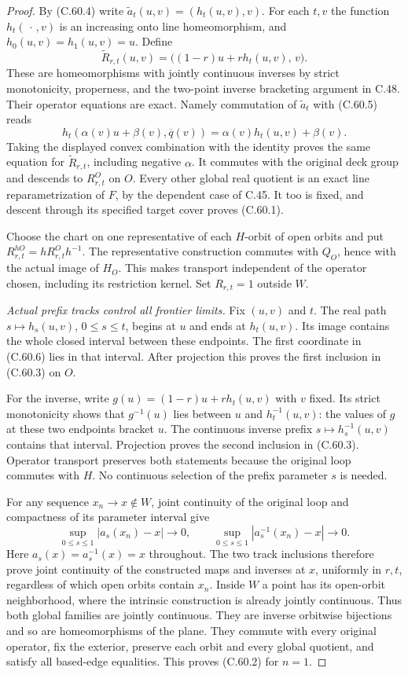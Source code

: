 \begin{proof}
By (C.60.4) write
$\widetilde a_t(u,v)=(h_t(u,v),v)$.
For each $t,v$ the function $h_t(\,\cdot\,,v)$ is
an increasing onto line homeomorphism, and
$h_0(u,v)=h_1(u,v)=u$.
Define
\[
 \widetilde R_{r,t}(u,v)
                   =\bigl((1-r)u+r h_t(u,v),\,v\bigr). \tag{C.60.6}
\]
These are homeomorphisms with jointly continuous
inverses by strict monotonicity, properness, and
the two-point inverse bracketing argument in C.48.
Their operator equations are exact. Namely
commutation of $\widetilde a_t$ with (C.60.5) reads
\[
 h_t(\alpha(v)u+\beta(v),\overline q(v))
                         =\alpha(v)h_t(u,v)+\beta(v).
 \]
Taking the displayed convex combination with the
identity proves the same equation for
$\widetilde R_{r,t}$, including negative $\alpha$.
It commutes with the original deck group and
descends to $R^O_{r,t}$ on $O$.
Every other global real quotient is an exact
line reparametrization of $F$, by the dependent
case of C.45. It too is fixed, and descent through
its specified target cover proves (C.60.1).

Choose the chart on one representative of each
$H$-orbit of open orbits and put
$R^{hO}_{r,t}=hR^O_{r,t}h^{-1}$.
The representative construction commutes with
$Q_O$, hence with the actual image of $H_O$.
This makes transport independent of the operator
chosen, including its restriction kernel.
Set $R_{r,t}=1$ outside $W$.

\emph{Actual prefix tracks control all frontier limits.}
Fix $(u,v)$ and $t$. The real path
$s\mapsto h_s(u,v)$, $0\leq s\leq t$, begins at
$u$ and ends at $h_t(u,v)$.
Its image contains the whole closed interval
between these endpoints.
The first coordinate in (C.60.6) lies in that interval.
After projection this proves the first inclusion
in (C.60.3) on $O$.

For the inverse, write
$g(u)=(1-r)u+r h_t(u,v)$ with $v$ fixed.
Its strict monotonicity shows that $g^{-1}(u)$
lies between $u$ and $h_t^{-1}(u,v)$:
the values of $g$ at these two endpoints bracket $u$.
The continuous inverse prefix
$s\mapsto h_s^{-1}(u,v)$ contains that interval.
Projection proves the second inclusion in (C.60.3).
Operator transport preserves both statements
because the original loop commutes with $H$.
No continuous selection of the prefix parameter
$s$ is needed.

For any sequence $x_n\to x\notin W$, joint
continuity of the original loop and compactness
of its parameter interval give
\[
 \sup_{0\leq s\leq1}|a_s(x_n)-x|\longrightarrow0,\qquad
 \sup_{0\leq s\leq1}|a_s^{-1}(x_n)-x|\longrightarrow0.
                                                               \tag{C.60.7}
\]
Here $a_s(x)=a_s^{-1}(x)=x$ throughout.
The two track inclusions therefore prove joint
continuity of the constructed maps and inverses
at $x$, uniformly in $r,t$, regardless of which
open orbits contain $x_n$.
Inside $W$ a point has its open-orbit neighborhood,
where the intrinsic construction is already
jointly continuous.
Thus both global families are jointly continuous.
They are inverse orbitwise bijections and so
are homeomorphisms of the plane.
They commute with every original operator,
fix the exterior, preserve each orbit and every
global quotient, and satisfy all based-edge
equalities. This proves (C.60.2) for $n=1$.


\end{proof}
